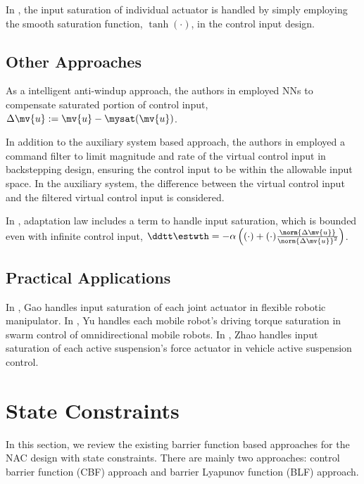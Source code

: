 \hfill

In \cite{Li:2024aa}, the input saturation of individual actuator is handled by simply employing the smooth saturation function, $\tanh(\cdot)$, in the control input design.

\subsection{Other Approaches}

As a intelligent anti-windup approach, the authors in \cite{Gao:2006aa} employed NNs to compensate saturated portion of control input, $\Delta \mv{u} := \mv{u} - \mysat(\mv{u})$.

In addition to the auxiliary system based approach, the authors in \cite{Chen:2011aa} employed a command filter to limit magnitude and rate of the virtual control input in backstepping design, ensuring the control input to be within the allowable input space.
In the auxiliary system, the difference between the virtual control input and the filtered virtual control input is considered.

In \cite{Esfandiari:2017aa}, adaptation law includes a term to handle input saturation, which is bounded even with infinite control input, \ie 
$
    \ddtt\estwth 
    = 
    -\alpha
    \left(
        (\cdot) + (\cdot)\tfrac{\norm{\Delta \mv{u}}}{\norm{\Delta \mv{u}}^2}
    \right)
$.

\subsection{Practical Applications}

In \cite{Gao:2026aa}, Gao \etal handles input saturation of each joint actuator in flexible robotic manipulator.
In \cite{Yu:2022aa}, Yu \etal handles each mobile robot's driving torque saturation in swarm control of omnidirectional mobile robots.
In \cite{Zhao:2016aa}, Zhao \etal handles input saturation of each active suspension's force actuator in vehicle active suspension control.

\section{State Constraints}

In this section, we review the existing barrier function based approaches for the NAC design with state constraints. 
There are mainly two approaches: control barrier function (CBF) approach and barrier Lyapunov function (BLF) approach.

